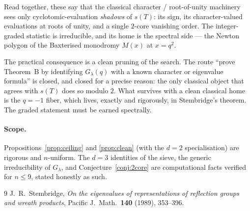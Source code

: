 \documentclass{article}
\theoremstyle{definition}
\theoremstyle{remark}
\begin{document}
Read together, these say that the classical character / root-of-unity machinery
sees only cyclotomic-evaluation \emph{shadows} of $s(T)$: its sign, its
character-valued evaluations at roots of unity, and a single $2$-core vanishing
order. The integer-graded statistic is irreducible, and its home is the spectral
side --- the Newton polygon of the Baxterised monodromy $M(x)$ at $x = q^2$.

The practical consequence is a clean pruning of the search. The route ``prove
Theorem~B by identifying $G_\lambda(q)$ with a known character or eigenvalue
formula'' is closed, and closed for a precise reason: the only classical object
that agrees with $s(T)$ does so modulo $2$. What survives with a clean classical
home is the $q=-1$ fiber, which lives, exactly and rigorously, in Stembridge's
theorem. The graded statement must be earned spectrally.

\paragraph{Scope.}
Propositions~\ref{prop:ceiling} and \ref{prop:clean} (with the $d=2$ specialisation)
are rigorous and $n$-uniform. The $d=3$ identities of the sieve, the generic
irreducibility of $G_\lambda$, and Conjecture~\ref{conj:2core} are computational
facts verified for $n \le 9$, stated honestly as such.

\begin{thebibliography}{9}
J.~R.~Stembridge, \emph{On the eigenvalues of representations of reflection
groups and wreath products}, Pacific J.\ Math.\ \textbf{140} (1989), 353--396.
\end{thebibliography}
\end{document}
